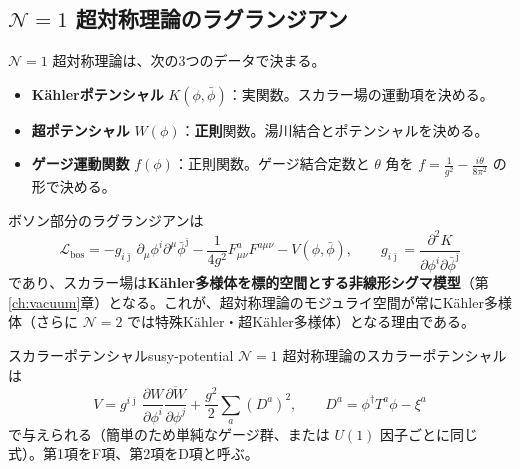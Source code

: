 \documentclass[uplatex, dvipdfmx, book]{jsbook}
\let\origsubsection\subsection
\let\origsubsubsection\subsubsection
\renewcommand{\section}{\origsubsection}
\renewcommand{\subsection}{\origsubsubsection}
\renewcommand{\subsubsection}{\paragraph}
\begin{document}
\section{$\mathcal{N} = 1$ 超対称理論のラグランジアン}

$\mathcal{N} = 1$ 超対称理論は、次の3つのデータで決まる。
\begin{itemize}
    \item \textbf{K\"ahlerポテンシャル} $K(\phi, \bar\phi)$：実関数。スカラー場の運動項を決める。
    \item \textbf{超ポテンシャル} $W(\phi)$：\textbf{正則}関数。湯川結合とポテンシャルを決める。
    \item \textbf{ゲージ運動関数} $f(\phi)$：正則関数。ゲージ結合定数と $\theta$ 角を $f = \frac{1}{g^2} - \frac{i\theta}{8\pi^2}$ の形で決める。
\end{itemize}
ボソン部分のラグランジアンは
\begin{equation}
    \mathcal{L}_{\text{bos}} = -g_{i\bar\jmath}\,\partial_\mu\phi^i \partial^\mu\bar\phi^{\bar\jmath} - \frac{1}{4g^2}F^a_{\mu\nu}F^{a\mu\nu} - V(\phi, \bar\phi), \qquad g_{i\bar\jmath} = \frac{\partial^2 K}{\partial\phi^i\partial\bar\phi^{\bar\jmath}}
\end{equation}
であり、スカラー場は\textbf{K\"ahler多様体を標的空間とする非線形シグマ模型}（第\ref{ch:vacuum}章）となる。これが、超対称理論のモジュライ空間が常にK\"ahler多様体（さらに $\mathcal{N} = 2$ では特殊K\"ahler・超K\"ahler多様体）となる理由である。

\begin{myprop}{スカラーポテンシャル}{susy-potential}
$\mathcal{N} = 1$ 超対称理論のスカラーポテンシャルは
\begin{equation*}
    V = g^{i\bar\jmath}\,\frac{\partial W}{\partial\phi^i}\overline{\frac{\partial W}{\partial\phi^j}} + \frac{g^2}{2}\sum_a (D^a)^2, \qquad D^a = \phi^\dagger T^a \phi - \xi^a
\end{equation*}
で与えられる（簡単のため単純なゲージ群、または $U(1)$ 因子ごとに同じ式）。第1項をF項、第2項をD項と呼ぶ。
\end{myprop}
\end{document}
